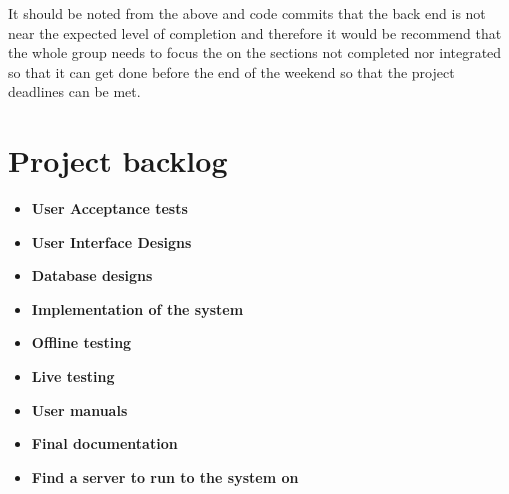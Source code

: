 \documentclass[12pt]{article}
\begin{document}
It should be noted from the above and code commits that the back end is not near the expected level of completion and therefore it would be recommend that the whole group needs to focus the on the sections not completed nor integrated so that it can get done before the end of the weekend so that the project deadlines can be met.
\section{Project backlog}

\begin{itemize}
\item \textbf{User Acceptance tests}
\item \textbf{User Interface Designs}
\item \textbf{Database designs}
\item \textbf{Implementation of the system}
\item \textbf{Offline testing}
\item \textbf{Live testing}
\item \textbf{User manuals}
\item \textbf{Final documentation}
\item \textbf{Find a server to run to the system on}


\end{itemize}
\end{document}

